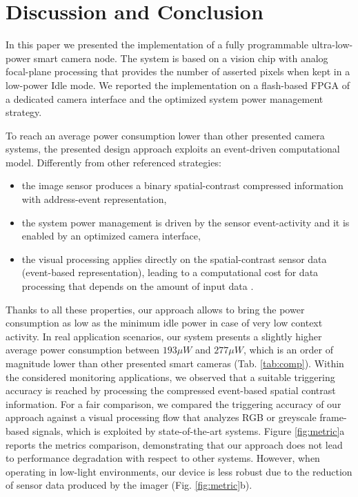 \documentclass[journal]{IEEEtran}
\begin{document}



\section{Discussion and Conclusion}

\label{sec:concl}
In this paper we presented the implementation of a fully programmable ultra-low-power smart camera node. The system is based on a vision chip with analog focal-plane processing that provides the number of asserted pixels when kept in a low-power Idle mode. We reported the implementation on a flash-based FPGA of a dedicated camera interface and the optimized system power management strategy. 

To reach an average power consumption lower than other presented camera systems, the presented design approach exploits an event-driven computational model. Differently from other referenced strategies:
\begin{itemize}
\item the image sensor produces a binary spatial-contrast compressed information with address-event representation,
\item the system power management is driven by the sensor event-activity and it is enabled by an optimized camera interface,
\item the visual processing applies directly on the spatial-contrast sensor data (event-based representation), leading to a computational cost for data processing that depends on the amount of input data \cite{RusciISC2}.
\end{itemize} 
Thanks to all these properties, our approach allows to bring the power consumption as low as the minimum idle power in case of very low context activity. In real application scenarios, our system presents a slightly higher average power consumption between $193\mu W$ and $277\mu W$, which is an order of magnitude lower than other presented smart cameras (Tab. \ref{tab:comp}). Within the considered monitoring applications, we observed that a suitable triggering accuracy is reached by processing the compressed event-based spatial contrast information. For a fair comparison, we compared the triggering accuracy of our approach against a visual processing flow that analyzes RGB or greyscale frame-based signals, which is exploited by state-of-the-art systems. Figure \ref{fig:metric}a reports the metrics comparison, demonstrating that our approach does not lead to performance degradation with respect to other systems. However, when operating in low-light environments, our device is less robust due to the reduction of sensor data produced by the imager (Fig. \ref{fig:metric}b).
\end{document}
